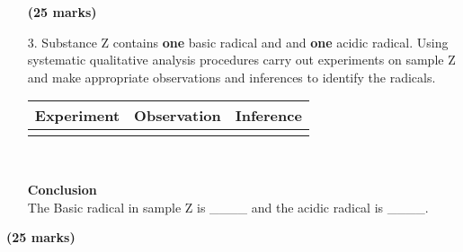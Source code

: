 \begin{enumerate}
\raggedleft \textbf{(25 marks)}

\raggedright

\item[3.] Substance Z contains \textbf{one} basic radical and and \textbf{one} acidic radical. Using systematic qualitative analysis procedures carry out experiments on sample Z and make appropriate observations and inferences to identify the radicals.\\

\begin{center}
\begin{tabular}{|p{4cm}|p{4cm}|p{4cm}|}
\hline
\textbf{Experiment}&\textbf{Observation}&\textbf{Inference}\\ \hline
&&\\
\hline
\end{tabular}\\
\end{center}

\textbf{Conclusion}\\

The Basic radical in sample Z is \_\_\_\_ and the acidic radical is \_\_\_\_.\\


\end{enumerate}

\raggedleft \textbf{(25 marks)}\\

\raggedright
